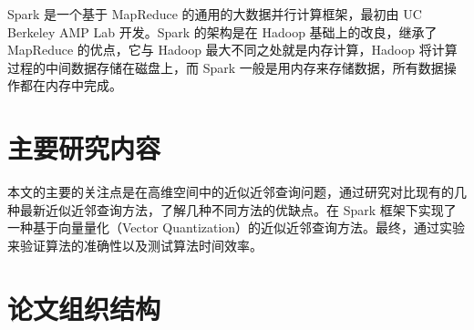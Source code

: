 Spark 是一个基于 MapReduce 的通用的大数据并行计算框架，最初由 UC Berkeley AMP Lab 开发。Spark 的架构是在 Hadoop 基础上的改良，继承了 MapReduce 的优点，它与 Hadoop 最大不同之处就是内存计算，Hadoop 将计算过程的中间数据存储在磁盘上，而 Spark 一般是用内存来存储数据，所有数据操作都在内存中完成。

\section{主要研究内容}
本文的主要的关注点是在高维空间中的近似近邻查询问题，通过研究对比现有的几种最新近似近邻查询方法，了解几种不同方法的优缺点。在 Spark 框架下实现了一种基于向量量化（Vector Quantization）的近似近邻查询方法。最终，通过实验来验证算法的准确性以及测试算法时间效率。

\section{论文组织结构}